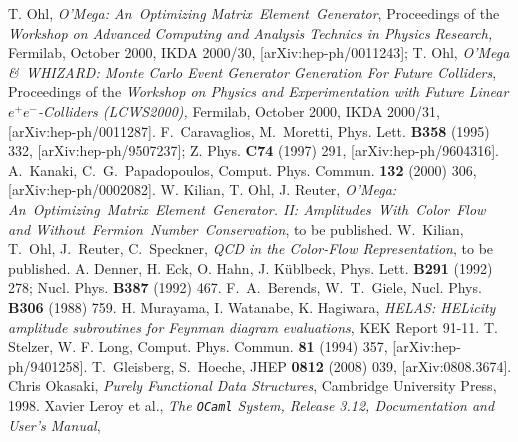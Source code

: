 \documentclass[12pt,a4paper]{article}
\def\OCaml/{\texttt{OCaml}}
\begin{document}
\begin{thebibliography}{10}
    T. Ohl, \textit{O'Mega: An~Optimizing Matrix~Element~Generator},
    Proceedings of the \textit{Workshop on Advanced Computing and
    Analysis Technics in Physics Research,} Fermilab, October 2000,
    IKDA 2000/30, [arXiv:hep-ph/0011243];
    T. Ohl, \textit{O'Mega \&\ WHIZARD: Monte Carlo Event Generator
    Generation For Future Colliders}, Proceedings of the
    \textit{Workshop on Physics and Experimentation with Future Linear
    $e^+e^-$-Colliders (LCWS2000),} Fermilab, October 2000,
    IKDA 2000/31, [arXiv:hep-ph/0011287].
    F.~Caravaglios, M.~Moretti,
    Phys.{} Lett.{} \textbf{B358} (1995) 332,
    [arXiv:hep-ph/9507237];
    Z.{} Phys.{} \textbf{C74} (1997) 291,
    [arXiv:hep-ph/9604316].
    A.~Kanaki, C.~G.~Papadopoulos,
    Comput.{} Phys.{} Commun.{} \textbf{132 } (2000) 306,
    [arXiv:hep-ph/0002082].
    W. Kilian, T. Ohl, J. Reuter,
    \textit{O'Mega: An~Optimizing~Matrix~Element~Generator.
    II: Amplitudes~With~Color~Flow and Without~Fermion~Number~Conservation},
    to be published.
    W.~Kilian, T.~Ohl, J.~Reuter, C.~Speckner,
    \textit{QCD in the Color-Flow Representation},
    to be published.
    A. Denner, H. Eck, O. Hahn, J. K\"ublbeck,
    Phys.{} Lett.{}  \textbf{B291} (1992) 278;
    Nucl.{} Phys.{}  \textbf{B387} (1992) 467.
    F.~A.~Berends, W.~T.~Giele,
    Nucl.{} Phys.{} \textbf{B306} (1988) 759.
    H. Murayama, I. Watanabe, K. Hagiwara,
    \textit{HELAS: HELicity amplitude subroutines for Feynman diagram
      evaluations},
    KEK Report 91-11.
    T. Stelzer, W. F. Long,
    Comput.{} Phys.{} Commun.{} \textbf{81} (1994) 357,
    [arXiv:hep-ph/9401258].
    T.~Gleisberg, S.~Hoeche,
    JHEP \textbf{0812} (2008)  039,
    [arXiv:0808.3674].
    Chris Okasaki,
    \textit{Purely Functional Data Structures},
    Cambridge University Press, 1998.
    Xavier Leroy et al.,
    \textit{The \OCaml/ System, Release 3.12, Documentation and User's Manual},

\end{thebibliography}
\end{document}
